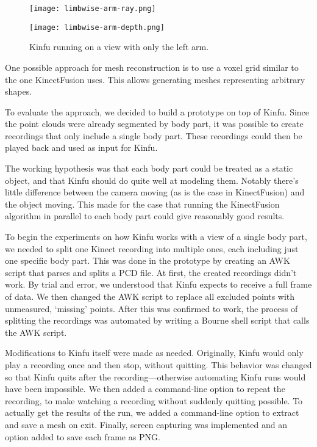 \begin{figure}
    \centering
    \begin{minipage}{0.49\textwidth}
        \texttt{[image: limbwise-arm-ray.png]}
    \end{minipage}
    \begin{minipage}{0.49\textwidth}
        \texttt{[image: limbwise-arm-depth.png]}
    \end{minipage}
    \caption{Kinfu running on a view with only the left arm.}
    \label{fig:limbwise-arm}
\end{figure}

One possible approach for mesh reconstruction is to use a voxel grid similar to the one KinectFusion \autocites{newcombe2011kinectfusion}{izadi2011kinectfusion} uses. This allows generating meshes representing arbitrary shapes.

To evaluate the approach, we decided to build a prototype on top of Kinfu. Since the point clouds were already segmented by body part, it was possible to create recordings that only include a single body part. These recordings could then be played back and used as input for Kinfu.

The working hypothesis was that each body part could be treated as a static object, and that Kinfu should do quite well at modeling them. Notably there's little difference between the camera moving (as is the case in KinectFusion) and the object moving. This made for the case that running the KinectFusion algorithm in parallel to each body part could give reasonably good results.

To begin the experiments on how Kinfu works with a view of a single body part, we needed to split one Kinect recording into multiple ones, each including just one specific body part. This was done in the prototype by creating an AWK script that parses and splits a PCD file. At first, the created recordings didn't work. By trial and error, we understood that Kinfu expects to receive a full frame of data. We then changed the AWK script to replace all excluded points with unmeasured, `missing' points. After this was confirmed to work, the process of splitting the recordings was automated by writing a Bourne shell script that calls the AWK script.

Modifications to Kinfu itself were made as needed. Originally, Kinfu would only play a recording once and then stop, without quitting. This behavior was changed so that Kinfu quits after the recording---otherwise automating Kinfu runs would have been impossible. We then added a command-line option to repeat the recording, to make watching a recording without suddenly quitting possible. To actually get the results of the run, we added a command-line option to extract and save a mesh on exit. Finally, screen capturing was implemented and an option added to save each frame as PNG.

